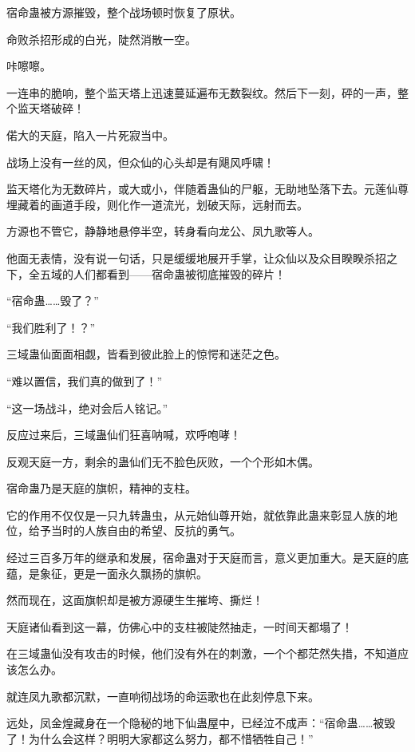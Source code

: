 
\begin{this_body}



宿命蛊被方源摧毁，整个战场顿时恢复了原状。

命败杀招形成的白光，陡然消散一空。

咔嚓嚓。

一连串的脆响，整个监天塔上迅速蔓延遍布无数裂纹。然后下一刻，砰的一声，整个监天塔破碎！

偌大的天庭，陷入一片死寂当中。

战场上没有一丝的风，但众仙的心头却是有飓风呼啸！

监天塔化为无数碎片，或大或小，伴随着蛊仙的尸躯，无助地坠落下去。元莲仙尊埋藏着的画道手段，则化作一道流光，划破天际，远射而去。

方源也不管它，静静地悬停半空，转身看向龙公、凤九歌等人。

他面无表情，没有说一句话，只是缓缓地展开手掌，让众仙以及众目睽睽杀招之下，全五域的人们都看到——宿命蛊被彻底摧毁的碎片！

“宿命蛊……毁了？”

“我们胜利了！？”

三域蛊仙面面相觑，皆看到彼此脸上的惊愕和迷茫之色。

“难以置信，我们真的做到了！”

“这一场战斗，绝对会后人铭记。”

反应过来后，三域蛊仙们狂喜呐喊，欢呼咆哮！

反观天庭一方，剩余的蛊仙们无不脸色灰败，一个个形如木偶。

宿命蛊乃是天庭的旗帜，精神的支柱。

它的作用不仅仅是一只九转蛊虫，从元始仙尊开始，就依靠此蛊来彰显人族的地位，给予当时的人族自由的希望、反抗的勇气。

经过三百多万年的继承和发展，宿命蛊对于天庭而言，意义更加重大。是天庭的底蕴，是象征，更是一面永久飘扬的旗帜。

然而现在，这面旗帜却是被方源硬生生摧垮、撕烂！

天庭诸仙看到这一幕，仿佛心中的支柱被陡然抽走，一时间天都塌了！

在三域蛊仙没有攻击的时候，他们没有外在的刺激，一个个都茫然失措，不知道应该怎么办。

就连凤九歌都沉默，一直响彻战场的命运歌也在此刻停息下来。

远处，凤金煌藏身在一个隐秘的地下仙蛊屋中，已经泣不成声：“宿命蛊……被毁了！为什么会这样？明明大家都这么努力，都不惜牺牲自己！”


\end{this_body}
